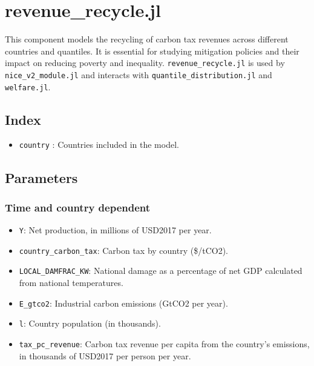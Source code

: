 \documentclass[
]{article}
\providecommand{\tightlist}{%
  \setlength{\itemsep}{0pt}\setlength{\parskip}{0pt}}
\begin{document}
\section{revenue\_recycle.jl}\label{revenue_recycle.jl}

This component models the recycling of carbon tax revenues across
different countries and quantiles. It is essential for studying
mitigation policies and their impact on reducing poverty and inequality.
\texttt{revenue\_recycle.jl} is used by \texttt{nice\_v2\_module.jl}
and interacts with \texttt{quantile\_distribution.jl} and
\texttt{welfare.jl}.

\subsection{Index}\label{index-2}

\begin{itemize}
\tightlist
\item
  \texttt{country} : Countries included in the model.
\end{itemize}

\subsection{Parameters}\label{parameters-6}

\subsubsection{Time and country
dependent}\label{time-and-country-dependent-12}

\begin{itemize}
\tightlist
\item
  \texttt{Y}: Net production, in millions of USD2017 per year.
\item
  \texttt{country\_carbon\_tax}: Carbon tax by country (\$/tCO2).
\item
  \texttt{LOCAL\_DAMFRAC\_KW}: National damage as a percentage of net
  GDP calculated from national temperatures.
\item
  \texttt{E\_gtco2}: Industrial carbon emissions (GtCO2 per year).
\item
  \texttt{l}: Country population (in thousands).
\item
  \texttt{tax\_pc\_revenue}: Carbon tax revenue per capita from the
  country's emissions, in thousands of USD2017 per person per year.
\end{itemize}
\end{document}
